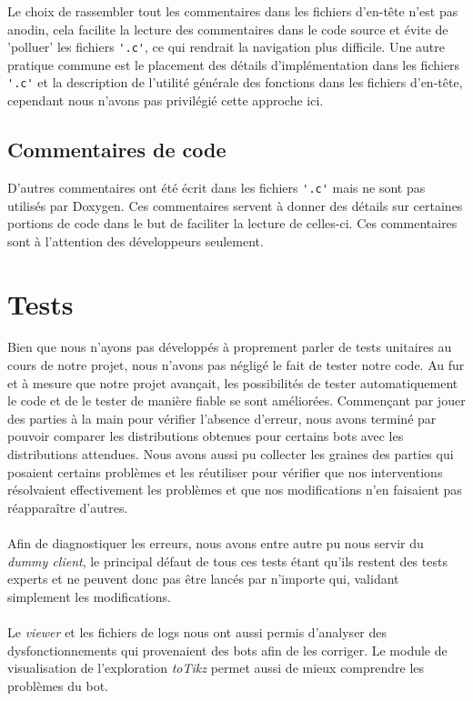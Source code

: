 \documentclass[a4paper,12pt]{article}
\begin{document}
Le choix de rassembler tout les commentaires dans les fichiers d'en-tête n'est
pas anodin, cela facilite la lecture des commentaires dans le code source et
évite de 'polluer' les fichiers \verb!'.c'!, ce qui rendrait la navigation
plus difficile. Une autre pratique commune est le placement des détails
d'implémentation dans les fichiers \verb!'.c'! et la description de l'utilité
générale des fonctions dans les fichiers d'en-tête, cependant nous n'avons pas
privilégié cette approche ici.

\subsection{Commentaires de code}

D'autres commentaires ont été écrit dans les fichiers \verb!'.c'! mais ne sont
pas utilisés par Doxygen. Ces commentaires servent à donner des détails sur
certaines portions de code dans le but de faciliter la lecture de celles-ci.
Ces commentaires sont à l'attention des développeurs seulement.

\section{Tests}
Bien que nous n'ayons pas développés à proprement parler de tests unitaires au
cours de notre projet, nous n'avons pas négligé le fait de tester notre code. Au
fur et à mesure que notre projet avançait, les possibilités de tester
automatiquement le code et de le tester de manière fiable se sont améliorées.
Commençant par jouer des parties à la main pour vérifier l'absence d'erreur,
nous avons terminé par pouvoir comparer les distributions obtenues pour certains
bots avec les distributions attendues. Nous avons aussi pu collecter les graines
des parties qui posaient certains problèmes et les réutiliser pour vérifier que
nos interventions résolvaient effectivement les problèmes et que nos
modifications n'en faisaient pas réapparaître d'autres.
\paragraph{}
Afin de diagnostiquer les erreurs, nous avons entre autre pu nous servir du
{\em dummy client}, le principal défaut de tous ces tests étant qu'ils restent
des tests experts et ne peuvent donc pas être lancés par n'importe qui, validant
simplement les modifications.
\paragraph{}
Le {\em viewer} et les fichiers de logs nous ont aussi permis d'analyser des
dysfonctionnements qui provenaient des bots afin de les corriger. Le module de
visualisation de l'exploration {\em toTikz} permet aussi de mieux comprendre les
problèmes du bot.
\end{document}
